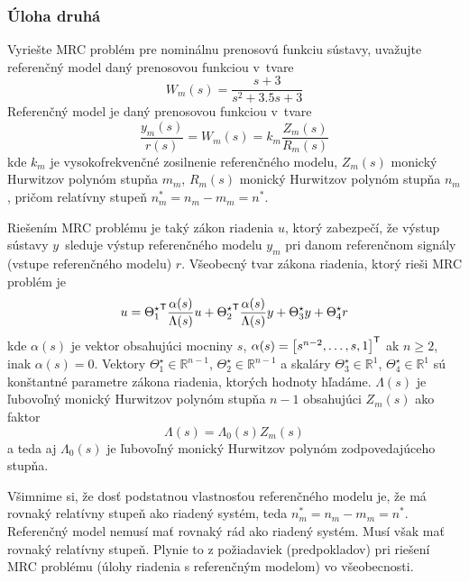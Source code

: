 \documentclass[a4paper, 10pt, ]{article}
\begin{document}
\subsubsection{Úloha druhá}


\smallskip

{\color{gray}

Vyriešte MRC problém pre nominálnu prenosovú funkciu sústavy, uvažujte referenčný model daný prenosovou funkciou v~tvare
\begin{equation*}
    W_m(s) = \frac{s + 3}{ s^2 + 3.5 s + 3}
\end{equation*}
Referenčný model je daný prenosovou funkciou v~tvare
\begin{equation*}
    \frac{y_m(s)}{r(s)} = W_m(s) = k_m \frac{Z_m(s)}{R_m(s)}
\end{equation*}
kde $k_m$ je vysokofrekvenčné zosilnenie referenčného modelu, $Z_m(s)$ monický Hurwitzov polynóm stupňa $m_m$, $R_m(s)$ monický Hurwitzov polynóm stupňa $n_m$, pričom relatívny stupeň $n^*_m = n_m - m_m = n^*$.

Riešením MRC problému je taký zákon riadenia $u$, ktorý zabezpečí, že výstup sústavy $y$~sleduje výstup referenčného modelu $y_m$ pri danom referenčnom signály (vstupe referenčného modelu) $r$. Všeobecný tvar zákona riadenia, ktorý rieši MRC problém je
\begin{equation*}
    u = {\Theta_1^\star}^{\mathsf{T}} \frac{\alpha(s)}{\Lambda(s)} u + {\Theta_2^\star}^{\mathsf{T}} \frac{\alpha(s)}{\Lambda(s)} y + \Theta_3^\star y + \Theta_4^\star r
\end{equation*}
kde $\alpha(s)$ je vektor obsahujúci mocniny $s$, $\alpha(s) = \begin{bmatrix} s^{n-2}, \ldots,s, 1 \end{bmatrix}^{\mathsf{T}}$ ak $n\geq 2$, inak $\alpha(s) = 0$. Vektory $\Theta_1^\star \in \mathbb{R}^{n-1}$, $\Theta_2^\star \in \mathbb{R}^{n-1}$ a skaláry $\Theta_3^\star \in \mathbb{R}^1$, $\Theta_4^\star \in \mathbb{R}^1$ sú konštantné parametre zákona riadenia, ktorých hodnoty hľadáme.  $\Lambda(s)$ je ľubovoľný monický Hurwitzov polynóm stupňa $n-1$ obsahujúci $Z_m(s)$ ako faktor
\begin{equation*}
    \Lambda(s) = \Lambda_0(s) Z_m(s)
\end{equation*}
a teda aj $\Lambda_0(s)$ je ľubovoľný monický Hurwitzov polynóm zodpovedajúceho stupňa.

}

\smallskip



Všimnime si, že dosť podstatnou vlastnosťou referenčného modelu je, že má rovnaký relatívny stupeň ako riadený systém, teda $n^*_m = n_m - m_m = n^*$. Referenčný model  nemusí mať rovnaký rád ako riadený systém. Musí však mať rovnaký relatívny stupeň. Plynie to z požiadaviek (predpokladov) pri riešení MRC problému (úlohy riadenia s referenčným modelom) vo všeobecnosti.
\end{document}
